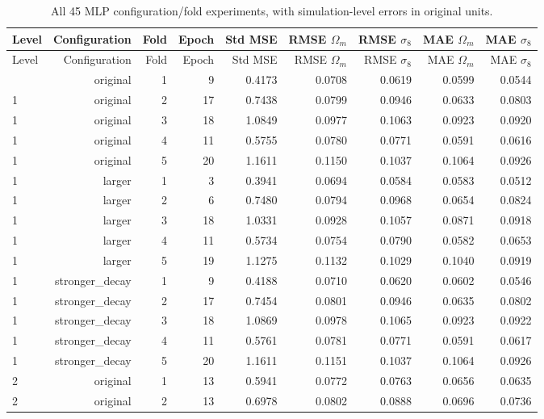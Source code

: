 \begingroup\footnotesize\setlength{\tabcolsep}{3pt}\renewcommand{\arraystretch}{1.05}
\begin{longtable}{lrrrrrrrr}
\caption{All 45 MLP configuration/fold experiments, with simulation-level errors in original units.}\label{tab:mlp-folds}\\
\toprule
Level & Configuration & Fold & Epoch & Std MSE & RMSE $\Omega_m$ & RMSE $\sigma_8$ & MAE $\Omega_m$ & MAE $\sigma_8$ \\
\midrule
\endfirsthead
\toprule
Level & Configuration & Fold & Epoch & Std MSE & RMSE $\Omega_m$ & RMSE $\sigma_8$ & MAE $\Omega_m$ & MAE $\sigma_8$ \\
\midrule\endhead
\bottomrule\endfoot
1 & original & 1 & 9 & 0.4173 & 0.0708 & 0.0619 & 0.0599 & 0.0544 \\
1 & original & 2 & 17 & 0.7438 & 0.0799 & 0.0946 & 0.0633 & 0.0803 \\
1 & original & 3 & 18 & 1.0849 & 0.0977 & 0.1063 & 0.0923 & 0.0920 \\
1 & original & 4 & 11 & 0.5755 & 0.0780 & 0.0771 & 0.0591 & 0.0616 \\
1 & original & 5 & 20 & 1.1611 & 0.1150 & 0.1037 & 0.1064 & 0.0926 \\
1 & larger & 1 & 3 & 0.3941 & 0.0694 & 0.0584 & 0.0583 & 0.0512 \\
1 & larger & 2 & 6 & 0.7480 & 0.0794 & 0.0968 & 0.0654 & 0.0824 \\
1 & larger & 3 & 18 & 1.0331 & 0.0928 & 0.1057 & 0.0871 & 0.0918 \\
1 & larger & 4 & 11 & 0.5734 & 0.0754 & 0.0790 & 0.0582 & 0.0653 \\
1 & larger & 5 & 19 & 1.1275 & 0.1132 & 0.1029 & 0.1040 & 0.0919 \\
1 & stronger\_decay & 1 & 9 & 0.4188 & 0.0710 & 0.0620 & 0.0602 & 0.0546 \\
1 & stronger\_decay & 2 & 17 & 0.7454 & 0.0801 & 0.0946 & 0.0635 & 0.0802 \\
1 & stronger\_decay & 3 & 18 & 1.0869 & 0.0978 & 0.1065 & 0.0923 & 0.0922 \\
1 & stronger\_decay & 4 & 11 & 0.5761 & 0.0781 & 0.0771 & 0.0591 & 0.0617 \\
1 & stronger\_decay & 5 & 20 & 1.1611 & 0.1151 & 0.1037 & 0.1064 & 0.0926 \\
2 & original & 1 & 13 & 0.5941 & 0.0772 & 0.0763 & 0.0656 & 0.0635 \\
2 & original & 2 & 13 & 0.6978 & 0.0802 & 0.0888 & 0.0696 & 0.0736 \\

\end{longtable}
